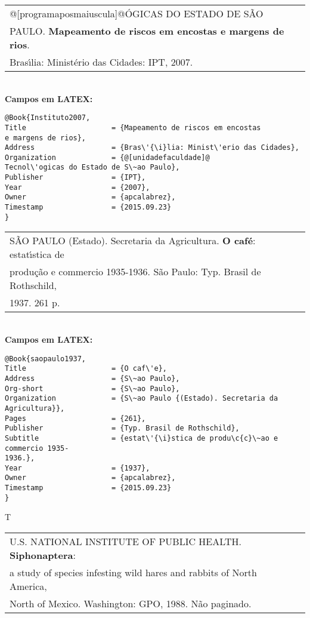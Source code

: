 \begin{tabular}{|l|c|} \hline
	@[programaposmaiuscula]@\'OGICAS DO ESTADO DE S\~AO \\
	PAULO.  \textbf{Mapeamento de riscos em encostas e margens de rios}. \\ 
	Bras\'{\i}lia: Minist\'erio das Cidades: IPT, 2007.   \\\hline
\end{tabular}\\

\textbf{Campos em LATEX:}

\begin{verbatim}
@Book{Instituto2007,
Title                    = {Mapeamento de riscos em encostas
e margens de rios},
Address                  = {Bras\'{\i}lia: Minist\'erio das Cidades},
Organization             = {@[unidadefaculdade]@
Tecnol\'ogicas do Estado de S\~ao Paulo},
Publisher                = {IPT},
Year                     = {2007},
Owner                    = {apcalabrez},
Timestamp                = {2015.09.23}
}
\end{verbatim}

\begin{tabular}{|l|c|} \hline
	S\~AO PAULO (Estado). Secretaria da Agricultura. \textbf{O caf\'e}: estat\'{\i}stica de \\produ\c{c}\~ao e commercio 1935-1936. S\~ao Paulo: Typ. Brasil de Rothschild, \\1937. 261 p.  \\\hline
\end{tabular}\\

\textbf{Campos em LATEX:}

\begin{verbatim}
@Book{saopaulo1937,
Title                    = {O caf\'e},
Address                  = {S\~ao Paulo},
Org-short                = {S\~ao Paulo},
Organization             = {S\~ao Paulo {(Estado). Secretaria da 
Agricultura}},
Pages                    = {261},
Publisher                = {Typ. Brasil de Rothschild},
Subtitle                 = {estat\'{\i}stica de produ\c{c}\~ao e commercio 1935-
1936.},
Year                     = {1937},
Owner                    = {apcalabrez},
Timestamp                = {2015.09.23}
}
\end{verbatim}
T

\begin{tabular}{|l|c|} \hline
	U.S. NATIONAL INSTITUTE OF PUBLIC HEALTH. \textbf{Siphonaptera}: \\  a study
	of species infesting wild hares and rabbits of North America,\\ North of Mexico. Washington: GPO, 1988. N\~ao paginado.  \\\hline
\end{tabular}\\

